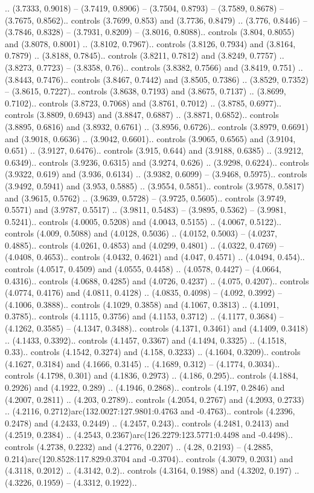 .. (3.7333, 0.9018) -- (3.7419, 0.8906) -- (3.7504, 0.8793) -- (3.7589, 0.8678) -- (3.7675, 0.8562).. controls (3.7699, 0.853) and (3.7736, 0.8479) .. (3.776, 0.8446) -- (3.7846, 0.8328) -- (3.7931, 0.8209) -- (3.8016, 0.8088).. controls (3.804, 0.8055) and (3.8078, 0.8001) .. (3.8102, 0.7967).. controls (3.8126, 0.7934) and (3.8164, 0.7879) .. (3.8188, 0.7845).. controls (3.8211, 0.7812) and (3.8249, 0.7757) .. (3.8273, 0.7723) -- (3.8358, 0.76).. controls (3.8382, 0.7566) and (3.8419, 0.751) .. (3.8443, 0.7476).. controls (3.8467, 0.7442) and (3.8505, 0.7386) .. (3.8529, 0.7352) -- (3.8615, 0.7227).. controls (3.8638, 0.7193) and (3.8675, 0.7137) .. (3.8699, 0.7102).. controls (3.8723, 0.7068) and (3.8761, 0.7012) .. (3.8785, 0.6977).. controls (3.8809, 0.6943) and (3.8847, 0.6887) .. (3.8871, 0.6852).. controls (3.8895, 0.6816) and (3.8932, 0.6761) .. (3.8956, 0.6726).. controls (3.8979, 0.6691) and (3.9018, 0.6636) .. (3.9042, 0.6601).. controls (3.9065, 0.6565) and (3.9104, 0.651) .. (3.9127, 0.6476).. controls (3.915, 0.644) and (3.9188, 0.6385) .. (3.9212, 0.6349).. controls (3.9236, 0.6315) and (3.9274, 0.626) .. (3.9298, 0.6224).. controls (3.9322, 0.619) and (3.936, 0.6134) .. (3.9382, 0.6099) -- (3.9468, 0.5975).. controls (3.9492, 0.5941) and (3.953, 0.5885) .. (3.9554, 0.5851).. controls (3.9578, 0.5817) and (3.9615, 0.5762) .. (3.9639, 0.5728) -- (3.9725, 0.5605).. controls (3.9749, 0.5571) and (3.9787, 0.5517) .. (3.9811, 0.5483) -- (3.9895, 0.5362) -- (3.9981, 0.5241).. controls (4.0005, 0.5208) and (4.0043, 0.5155) .. (4.0067, 0.5122).. controls (4.009, 0.5088) and (4.0128, 0.5036) .. (4.0152, 0.5003) -- (4.0237, 0.4885).. controls (4.0261, 0.4853) and (4.0299, 0.4801) .. (4.0322, 0.4769) -- (4.0408, 0.4653).. controls (4.0432, 0.4621) and (4.047, 0.4571) .. (4.0494, 0.454).. controls (4.0517, 0.4509) and (4.0555, 0.4458) .. (4.0578, 0.4427) -- (4.0664, 0.4316).. controls (4.0688, 0.4285) and (4.0726, 0.4237) .. (4.075, 0.4207).. controls (4.0774, 0.4176) and (4.0811, 0.4128) .. (4.0835, 0.4098) -- (4.092, 0.3992) -- (4.1006, 0.3888).. controls (4.1029, 0.3858) and (4.1067, 0.3813) .. (4.1091, 0.3785).. controls (4.1115, 0.3756) and (4.1153, 0.3712) .. (4.1177, 0.3684) -- (4.1262, 0.3585) -- (4.1347, 0.3488).. controls (4.1371, 0.3461) and (4.1409, 0.3418) .. (4.1433, 0.3392).. controls (4.1457, 0.3367) and (4.1494, 0.3325) .. (4.1518, 0.33).. controls (4.1542, 0.3274) and (4.158, 0.3233) .. (4.1604, 0.3209).. controls (4.1627, 0.3184) and (4.1666, 0.3145) .. (4.1689, 0.312) -- (4.1774, 0.3034).. controls (4.1798, 0.301) and (4.1836, 0.2973) .. (4.186, 0.295).. controls (4.1884, 0.2926) and (4.1922, 0.289) .. (4.1946, 0.2868).. controls (4.197, 0.2846) and (4.2007, 0.2811) .. (4.203, 0.2789).. controls (4.2054, 0.2767) and (4.2093, 0.2733) .. (4.2116, 0.2712)arc(132.0027:127.9801:0.4763 and -0.4763).. controls (4.2396, 0.2478) and (4.2433, 0.2449) .. (4.2457, 0.243).. controls (4.2481, 0.2413) and (4.2519, 0.2384) .. (4.2543, 0.2367)arc(126.2279:123.5771:0.4498 and -0.4498).. controls (4.2738, 0.2232) and (4.2776, 0.2207) .. (4.28, 0.2193) -- (4.2885, 0.214)arc(120.8528:117.829:0.3704 and -0.3704).. controls (4.3079, 0.2031) and (4.3118, 0.2012) .. (4.3142, 0.2).. controls (4.3164, 0.1988) and (4.3202, 0.197) .. (4.3226, 0.1959) -- (4.3312, 0.1922).. 